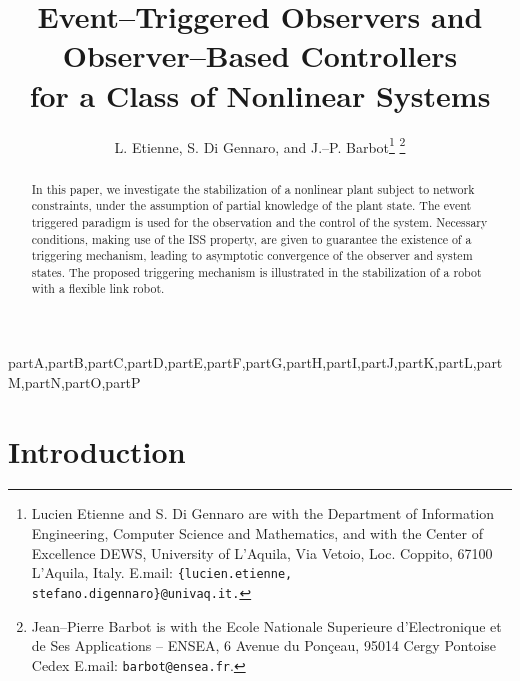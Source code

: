 \documentclass[letterpaper, 10 pt, conference]{ieeeconf}
\def\compile{partA,partB,partC,partD,partE,partF,partG,partH,partI,partJ,partK,partL,partM,partN,partO,partP}
\newenvironment{partA}[1][]{}{}
\begin{document}
                                                                \begin{xcomment}{\compile}
\begin{partA}







\title{\LARGE\bf Event--Triggered Observers and Observer--Based Controllers\\for a Class of Nonlinear Systems}


\author{L. Etienne, S. Di Gennaro, and J.--P. Barbot\thanks{Lucien Etienne and S. Di Gennaro are with the Department of Information Engineering, Computer Science and Mathematics, and with the Center of Excellence DEWS, University of L{'}Aquila, Via Vetoio, Loc. Coppito, 67100 L{'}Aquila, Italy. E.mail: {\tt \{lucien.etienne, stefano.digennaro\}@univaq.it.}}
\thanks{Jean--Pierre Barbot is with the Ecole Nationale Superieure d'Electronique et de Ses Applications -- ENSEA, 6 Avenue du Pon\c ceau, 95014 Cergy Pontoise Cedex E.mail: {\tt barbot@ensea.fr}.}
}     


\maketitle


\begin{abstract}

In this paper, we investigate the stabilization of a nonlinear plant subject to network constraints, under the assumption of partial knowledge of the plant state. The event triggered paradigm is used for the observation and the control of the system. Necessary conditions, making use of the ISS property, are given to guarantee the existence of a triggering mechanism, leading to asymptotic convergence of the observer and system states. The proposed triggering mechanism is illustrated in the stabilization of a robot with a flexible link robot.
\end{abstract}

\section{Introduction}


\end{partA}
\end{xcomment}
\end{document}
